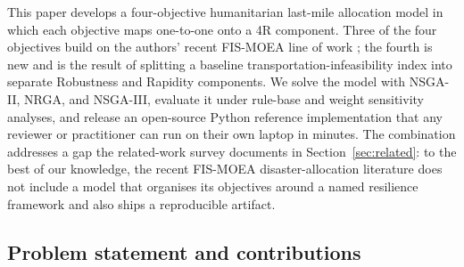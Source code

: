 \documentclass[applsci,article,submit,moreauthors,pdftex]{Definitions/mdpi}
\begin{document}
This paper develops a four-objective humanitarian last-mile allocation
model in which each objective maps one-to-one onto a 4R component. Three
of the four objectives build on the authors' recent FIS-MOEA line of work
\cite{rabiei2021, rabiei2023}; the fourth is new and is the
result of splitting a baseline transportation-infeasibility index
into separate Robustness and Rapidity components. We solve the model with
NSGA-II, NRGA, and NSGA-III, evaluate it under rule-base and weight
sensitivity analyses, and release an open-source Python reference
implementation that any reviewer or practitioner can run on their own
laptop in minutes. The combination addresses a gap the related-work survey
documents in Section~\ref{sec:related}: to the best of our knowledge, the
recent FIS-MOEA disaster-allocation literature does not include a model
that organises its objectives around a named resilience framework and
also ships a reproducible artifact.

\subsection*{Problem statement and contributions}
\end{document}
